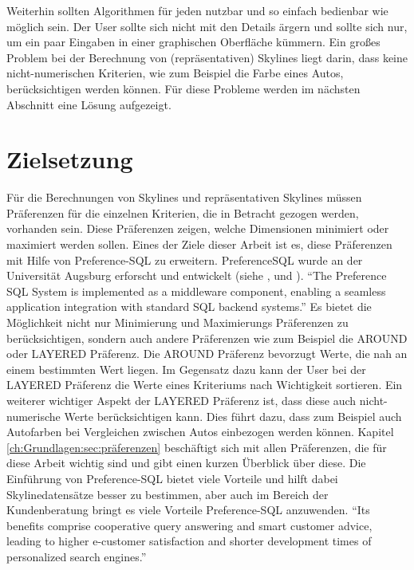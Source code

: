 Weiterhin sollten Algorithmen für jeden nutzbar und so einfach bedienbar wie möglich sein. Der User sollte sich nicht mit den Details ärgern und sollte sich nur, um ein paar Eingaben in einer graphischen Oberfläche kümmern. 
Ein großes Problem bei der Berechnung von (repräsentativen) Skylines liegt darin, dass keine nicht-numerischen Kriterien, wie zum Beispiel die Farbe eines Autos, berücksichtigen werden können. 
Für diese Probleme werden im nächsten Abschnitt eine Lösung aufgezeigt.
\section{Zielsetzung}
\label{ch:Einleitung:sec:Zielsetzung}
Für die Berechnungen von Skylines und repräsentativen Skylines müssen Präferenzen für die einzelnen Kriterien, die in Betracht gezogen werden, vorhanden sein. Diese Präferenzen zeigen, welche Dimensionen minimiert oder maximiert werden sollen.
Eines der Ziele dieser Arbeit ist es, diese Präferenzen mit Hilfe von Preference-SQL zu erweitern. PreferenceSQL wurde an der Universität Augsburg erforscht und entwickelt (siehe \cite{kiessling2011preference}, \cite{kiessling2002foundations} und \cite{kiessling2002preference}). 
\enquote{The Preference SQL System is implemented as a middleware component, enabling a seamless application integration with standard SQL backend systems.} \cite[p. 1]{kiessling2011preference}
Es bietet die Möglichkeit nicht nur Minimierung und Maximierungs Präferenzen zu berücksichtigen, sondern auch andere Präferenzen wie zum Beispiel die AROUND oder LAYERED Präferenz. Die AROUND Präferenz bevorzugt Werte, die nah an einem bestimmten Wert liegen. Im Gegensatz dazu kann der User bei der LAYERED Präferenz die Werte eines Kriteriums nach Wichtigkeit sortieren. Ein weiterer wichtiger Aspekt der LAYERED Präferenz ist, dass diese auch nicht-numerische Werte berücksichtigen kann. Dies führt dazu, dass zum Beispiel auch Autofarben bei Vergleichen zwischen Autos einbezogen werden können. Kapitel \ref{ch:Grundlagen:sec:präferenzen} beschäftigt sich mit allen Präferenzen, die für diese Arbeit wichtig sind und gibt einen kurzen Überblick über diese.
Die Einführung von Preference-SQL bietet viele Vorteile und hilft dabei Skylinedatensätze besser zu bestimmen, aber auch im Bereich der Kundenberatung bringt es viele Vorteile Preference-SQL anzuwenden.
\enquote{Its benefits comprise cooperative query answering and smart customer advice, leading to higher e-customer satisfaction and shorter development times of personalized search engines.}\cite[p. 1]{kiessling2002preference}

